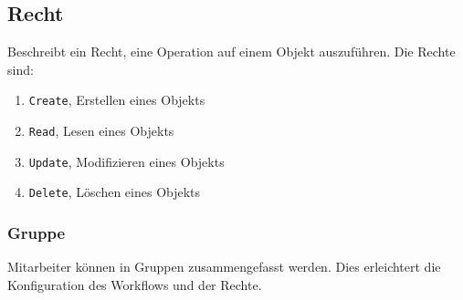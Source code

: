 \subsection{Recht}\label{model:recht}

Beschreibt ein Recht, eine Operation auf einem Objekt auszuführen. Die Rechte sind:

\begin{enumerate}\itemsep -5pt
\item \texttt{Create}, Erstellen eines Objekts
\item \texttt{Read}, Lesen eines Objekts
\item \texttt{Update}, Modifizieren eines Objekts
\item \texttt{Delete}, Löschen eines Objekts
\end{enumerate}

\subsubsection{Gruppe}\label{model:gruppe}

Mitarbeiter können in Gruppen zusammengefasst werden. Dies erleichtert die Konfiguration des Workflows und der Rechte.